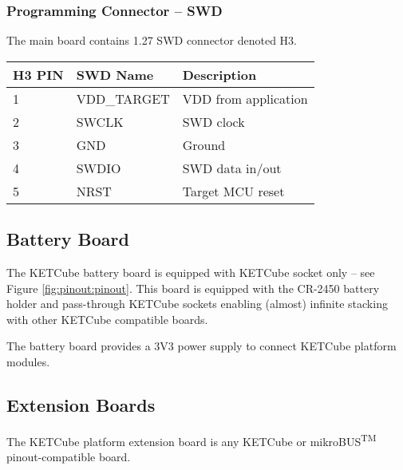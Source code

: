    
\subsubsection{Programming Connector -- SWD}

  The main board contains 1.27 SWD connector denoted H3.

   \begin{table*}[!ht]
    \hspace*{-4cm}
    \begin{tabular}{| p{2cm} | p{3cm} | p{7cm} |}
        \hline
        \rowcolor{SeaGreen3!30!} {\bf H3 PIN} & {\bf SWD Name} & {\bf Description} \\
        \hline
        \hline
        1 & VDD\_TARGET & VDD from application\\
        \hline
        2 & SWCLK & SWD clock\\
        \hline
        3 & GND & Ground\\
        \hline
        4 & SWDIO & SWD data in/out\\
        \hline
        5 & NRST & Target MCU reset\\
        \hline
    \end{tabular}
    \label{tab:boards:MBP}
   \end{table*}

   \newpage
   
\subsection{Battery Board}
  The KETCube battery board is equipped with KETCube socket only -- see Figure \ref{fig:pinout:pinout}. This board is equipped with the CR-2450 battery holder and pass-through KETCube sockets enabling (almost) infinite stacking with other KETCube compatible boards.
  
  The battery board provides a 3V3 power supply to connect KETCube platform modules.
  
  
\subsection{Extension Boards}
  The KETCube platform extension board is any KETCube or mikroBUS\textsuperscript{TM} pinout-compatible board.

